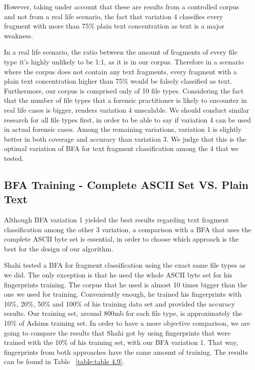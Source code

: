 However, taking under account that these are results from a controlled corpus and not from a real life scenario, the fact that variation 4 classifies every fragment with more than 75\% plain text concentration as text is a major weakness.

In a real life scenario, the ratio between the amount of fragments of every file type it's highly unlikely to be 1:1, as it is in our corpus. Therefore in a scenario where the corpus does not contain any text fragments, every fragment with a plain text concentration higher than 75\% would be falsely classified as text. Furthermore, our corpus is comprised only of 10 file types. Considering the fact that the number of file types that a forensic practitioner is likely to encounter in real life cases is bigger, renders variation 4 unscalable. We should conduct similar research for all file types first, in order to be able to say if variation 4 can be used in actual forensic cases. Among the remaining variations, variation 1 is slightly better in both coverage and accuracy than variation 3. We judge that this is the optimal variation of BFA for text fragment classification among the 4 that we tested.


\subsection{BFA Training - Complete ASCII Set VS. Plain Text }
Although BFA variation 1 yielded the best results regarding text fragment classification among the other 3 variation, a comparison with a BFA that uses the complete ASCII byte set is essential, in order to choose which approach is the best for the design of our algorithm.

Shahi\cite{Ashim} tested a BFA for fragment classification using the exact same file types as we did. The only exception is that he used the whole ASCII byte set for his fingerprints training. The corpus that he used is almost 10 times bigger than the one we used for training. Conveniently enough, he trained his fingerprints with 10\%, 20\%, 50\% and 100\% of his training data set and provided the accuracy results. Our training set, around 800mb for each file type, is approximately the 10\% of Ashims training set. In order to have a more objective comparison, we are going to compare the results that Shahi got by using fingerprints that were trained with the 10\% of his training set, with our BFA variation 1. That way, fingerprints from both approaches have the same amount of training. The results can be found in Table ~\ref{table:table 4.9}.

